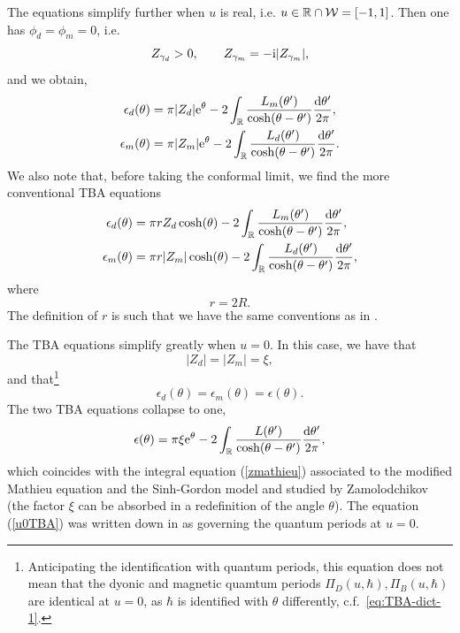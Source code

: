 \documentclass[a4paper,11pt]{article}
\theoremstyle{definition}
\newcommand{\CW}{{\cal W}}
\def\IR{{\mathbb R}}
\newcommand{\re}{{\rm e}}
\newcommand{\ri}{{\rm i}}
\newcommand{\rd}{{\rm d}}
\newcommand{\ba}{\begin{aligned}}
\newcommand{\ea}{\end{aligned}}
\def\IR{\mathbb{R}}
\begin{document}
The equations simplify further when $u$ is real, i.e.
$u \in \IR \cap \CW=[-1, 1]$. Then one has $\phi_d=\phi_m=0$, i.e.
\begin{equation}
  Z_{\gamma_d}>0, \qquad Z_{\gamma_m}=-\ri |Z_{\gamma_m}|, 
\end{equation}
and we obtain, 
%
\begin{equation}\label{eq:cTBA-1R}
  \ba
  \epsilon_d(\theta)&=\pi |Z_d| \re^{\theta}-2 \int_\IR { L_m(\theta')
    \over \cosh(\theta-\theta')} {\rd \theta' \over 2 \pi}, \\ 
  \epsilon_m(\theta)&=\pi |Z_m| \re^{\theta}-2 \int_\IR { L_d(\theta')
    \over \cosh(\theta-\theta')} {\rd \theta' \over 2 \pi}.
  \ea
\end{equation}
%
We also note that, before taking the conformal limit, we find the more
conventional TBA equations
%
%
\begin{equation}
  \ba
  \epsilon_d(\theta)&= \pi r Z_d \cosh(\theta)-2 \int_\IR
  {L_m(\theta') \over \cosh(\theta-\theta')} {\rd \theta' \over 2
    \pi}, \\ 
  \epsilon_m(\theta)&= \pi r |Z_m| \cosh(\theta)-2 \int_\IR
  {L_d(\theta') \over \cosh(\theta-\theta')} {\rd \theta' \over 2
    \pi},  
  \ea
\end{equation}
%
where 
%
\begin{equation}
  r=2 R. 
\end{equation}
%
The definition of $r$ is such that we have the same conventions as in
\cite{kl-mel-1}.

The TBA equations simplify greatly when $u=0$. In this case, we have
that
%
\begin{equation}
  |Z_d|= |Z_m|=\xi, 
\end{equation}
%
and that\footnote{Anticipating the identification
  with quantum periods, this equation does not mean that the dyonic
  and magnetic quamtum periods $\Pi_D(u,\hbar), \Pi_B(u,\hbar)$ are
  identical at $u=0$, as $\hbar$ is identified with $\theta$
  differently, c.f.~\eqref{eq:TBA-dict-1}.}
%
\begin{equation}
  \epsilon_d(\theta)= \epsilon_m(\theta)=\epsilon(\theta). 
\end{equation}
%
The two TBA equations collapse to one, 
%
\begin{equation}
  \label{u0TBA}
  \epsilon(\theta)=\pi \xi \re^{\theta}-2 \int_\IR {L(\theta') \over
    \cosh(\theta-\theta')} {\rd \theta' \over 2 \pi}, 
\end{equation}
%
which coincides with the integral equation (\ref{zmathieu})
associated to the modified Mathieu equation and the Sinh-Gordon model
and studied by Zamolodchikov (the factor $\xi$ can be absorbed in a
redefinition of the angle $\theta$). The equation (\ref{u0TBA}) was
written down in \cite{oper} as governing the quantum periods at $u=0$.
\end{document}
